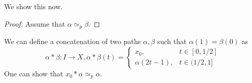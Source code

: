 \documentclass{article}
\theoremstyle{definition}
\begin{document}
We show this now.
\begin{proof}
    Assume that $\alpha \simeq_p \beta$.
\end{proof}
We can define a concatenation of two paths $\alpha, \beta$ such that $\alpha(1) = \beta(0)$ as 
\[
    \alpha * \beta : I \rightarrow X, \alpha * \beta (t) = \begin{cases}
        x_0, & t \in [0, 1/2] \\
        \alpha(2t-1), & t \in (1/2, 1]
    \end{cases}
\]
One can show that $x_0 * \alpha \simeq_p \alpha$.
\end{document}
